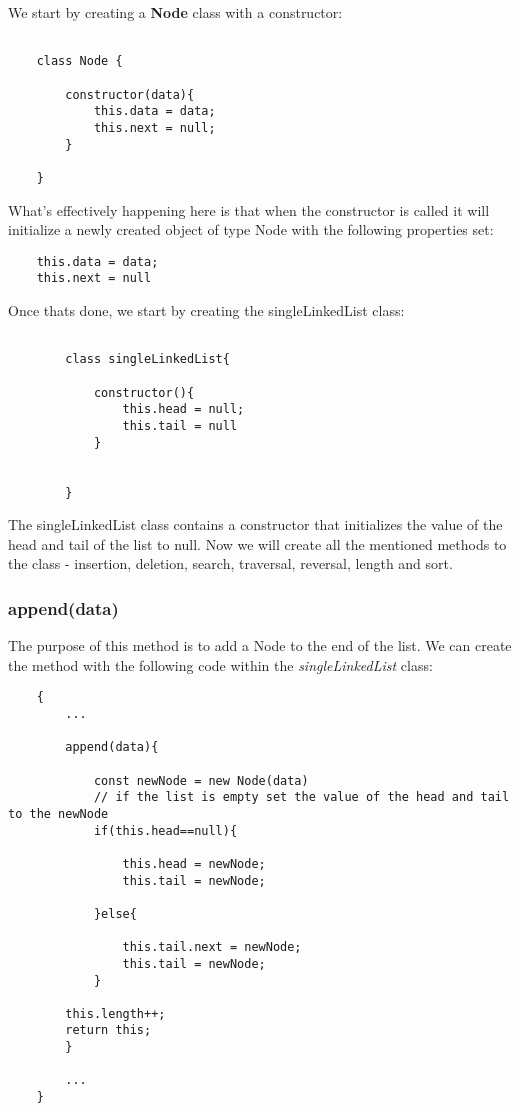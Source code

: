 \documentclass{article}
\begin{document}
We start by creating a \textbf{Node} class with a constructor:

\begin{verbatim}
    
    class Node {

        constructor(data){
            this.data = data;
            this.next = null;
        }

    }

\end{verbatim}
What's effectively happening here is that when the constructor is called it will initialize a newly created object of type Node with the following properties set: 
\begin{verbatim}
    this.data = data;
    this.next = null
\end{verbatim}


Once thats done, we start by creating the singleLinkedList class:

\begin{verbatim}
    
        class singleLinkedList{

            constructor(){
                this.head = null;
                this.tail = null
            }


        }
\end{verbatim}

The singleLinkedList class contains a constructor that initializes the value of the head and tail of the list to null. Now we will create all the mentioned methods to the class - insertion, deletion, search, traversal, reversal, length and sort.
\newpage
\subsubsection{append(data)}

The purpose of this method is to add a Node to the end of the list. We can create the method with the following code within the \textit{singleLinkedList} class:

\begin{verbatim}
    {
        ...

        append(data){

            const newNode = new Node(data)
            // if the list is empty set the value of the head and tail to the newNode
            if(this.head==null){

                this.head = newNode;
                this.tail = newNode;

            }else{

                this.tail.next = newNode;
                this.tail = newNode;
            }

        this.length++;
        return this;
        }

        ...
    }
\end{verbatim}
\end{document}
